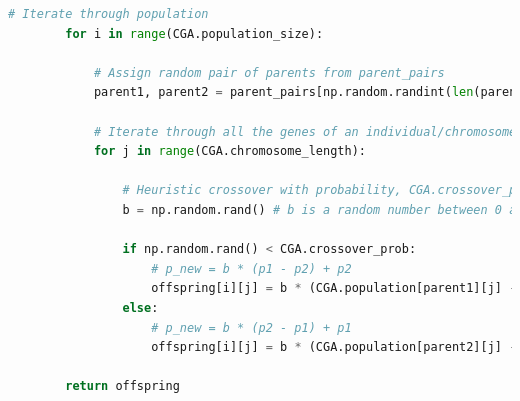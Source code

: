 \documentclass[10pt]{article}
\begin{document}
\begin{lstlisting}[language=Python, caption=mating\_functions.py, label=mating_functionspy]
        # Iterate through population
        for i in range(CGA.population_size):
    
            # Assign random pair of parents from parent_pairs
            parent1, parent2 = parent_pairs[np.random.randint(len(parent_pairs))]
            
            # Iterate through all the genes of an individual/chromosome
            for j in range(CGA.chromosome_length):
                
                # Heuristic crossover with probability, CGA.crossover_prob
                b = np.random.rand() # b is a random number between 0 and 1
    
                if np.random.rand() < CGA.crossover_prob:
                    # p_new = b * (p1 - p2) + p2 
                    offspring[i][j] = b * (CGA.population[parent1][j] - CGA.population[parent2][j]) + CGA.population[parent2][j]     
                else:
                    # p_new = b * (p2 - p1) + p1
                    offspring[i][j] = b * (CGA.population[parent2][j] - CGA.population[parent1][j]) + CGA.population[parent1][j]
                    
        return offspring    
\end{lstlisting}
\end{document}
